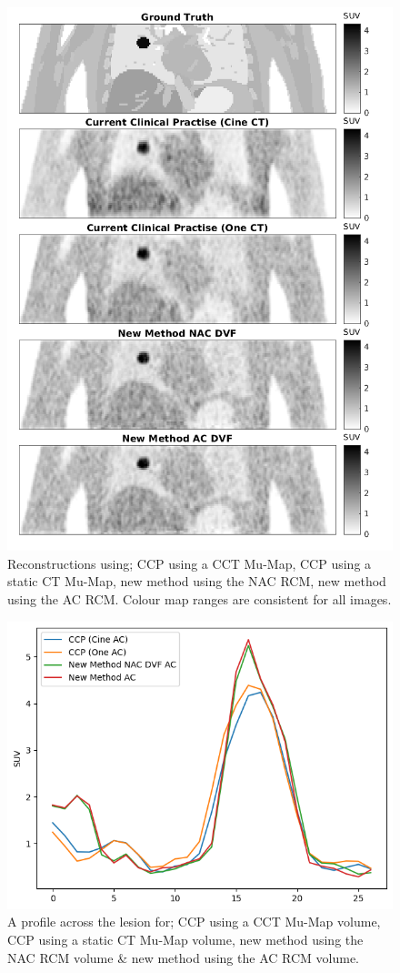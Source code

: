     \begin{figure}
        \centering
        \includegraphics[width=0.75\linewidth]{figures/visual_analysis.png}
        \captionsetup{singlelinecheck=false, justification=centering}
        \caption{Reconstructions using; \gls{CCP} using a \gls{CCT} \gls{Mu-Map}, \gls{CCP} using a static \gls{CT} \gls{Mu-Map}, new method using the \gls{NAC} \gls{RCM}, new method using the \gls{AC} \gls{RCM}. Colour map ranges are consistent for all images.}
        \label{fig:visual_analysis}
    \end{figure}
    
    \begin{figure}
        \centering
        \includegraphics[width=0.5\linewidth]{figures/profile.png}
        \captionsetup{singlelinecheck=false, justification=centering}
        \caption{A profile across the lesion for; \gls{CCP} using a \gls{CCT} \gls{Mu-Map} volume, \gls{CCP} using a static \gls{CT} \gls{Mu-Map} volume, new method using the \gls{NAC} \gls{RCM} volume \& new method using the \gls{AC} \gls{RCM} volume.}
        \label{fig:profile}
    \end{figure}
    
